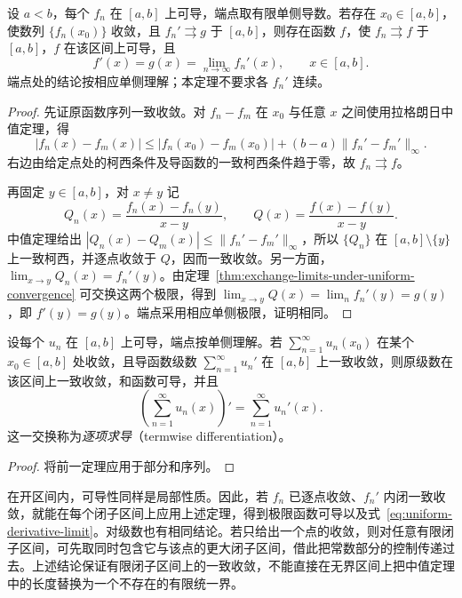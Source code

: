 \begin{theorem}[导数与极限的交换]
\label{thm:differentiation-of-function-sequence}
设 $a<b$，每个 $f_n$ 在 $[a,b]$ 上可导，端点取有限单侧导数。若存在 $x_0\in[a,b]$，使数列 $\{f_n(x_0)\}$ 收敛，且 $f_n'\rightrightarrows g$ 于 $[a,b]$，则存在函数 $f$，使 $f_n\rightrightarrows f$ 于 $[a,b]$，$f$ 在该区间上可导，且
\begin{equation}
    f'(x)=g(x)=\lim_{n\to\infty}f_n'(x),
    \qquad x\in[a,b].
    \label{eq:uniform-derivative-limit}
\end{equation}
端点处的结论按相应单侧理解；本定理不要求各 $f_n'$ 连续。
\end{theorem}

\begin{proof}
先证原函数序列一致收敛。对 $f_n-f_m$ 在 $x_0$ 与任意 $x$ 之间使用拉格朗日中值定理，得
\[
    |f_n(x)-f_m(x)|
    \leq|f_n(x_0)-f_m(x_0)|
       +(b-a)\|f_n'-f_m'\|_\infty.
\]
右边由给定点处的柯西条件及导函数的一致柯西条件趋于零，故 $f_n\rightrightarrows f$。

再固定 $y\in[a,b]$，对 $x\neq y$ 记
\[
    Q_n(x)=\frac{f_n(x)-f_n(y)}{x-y},\qquad
    Q(x)=\frac{f(x)-f(y)}{x-y}.
\]
中值定理给出 $|Q_n(x)-Q_m(x)|\leq\|f_n'-f_m'\|_\infty$，所以 $\{Q_n\}$ 在 $[a,b]\setminus\{y\}$ 上一致柯西，并逐点收敛于 $Q$，因而一致收敛。另一方面，$\lim_{x\to y}Q_n(x)=f_n'(y)$。由定理~\ref{thm:exchange-limits-under-uniform-convergence} 可交换这两个极限，得到 $\lim_{x\to y}Q(x)=\lim_nf_n'(y)=g(y)$，即 $f'(y)=g(y)$。端点采用相应单侧极限，证明相同。
\end{proof}

\begin{corollary}[逐项求导]
\label{cor:termwise-differentiation-uniform-derivative-series}
设每个 $u_n$ 在 $[a,b]$ 上可导，端点按单侧理解。若 $\sum_{n=1}^\infty u_n(x_0)$ 在某个 $x_0\in[a,b]$ 处收敛，且导函数级数 $\sum_{n=1}^\infty u_n'$ 在 $[a,b]$ 上一致收敛，则原级数在该区间上一致收敛，和函数可导，并且
\begin{equation}
    \left(\sum_{n=1}^\infty u_n(x)\right)'
       =\sum_{n=1}^\infty u_n'(x).
    \label{eq:termwise-differentiation-function-series}
\end{equation}
这一交换称为\emph{逐项求导}（termwise differentiation）。
\end{corollary}

\begin{proof}
将前一定理应用于部分和序列。
\end{proof}

在开区间内，可导性同样是局部性质。因此，若 $f_n$ 已逐点收敛、$f_n'$ 内闭一致收敛，就能在每个闭子区间上应用上述定理，得到极限函数可导以及式~\eqref{eq:uniform-derivative-limit}。对级数也有相同结论。若只给出一个点的收敛，则对任意有限闭子区间，可先取同时包含它与该点的更大闭子区间，借此把常数部分的控制传递过去。上述结论保证有限闭子区间上的一致收敛，不能直接在无界区间上把中值定理中的长度替换为一个不存在的有限统一界。

